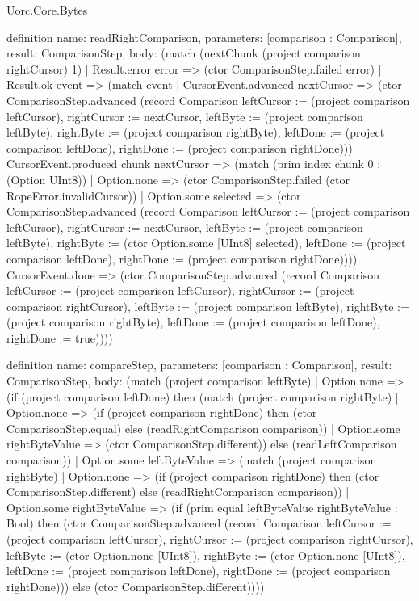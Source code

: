 \begin{lexlean}{Uorc.Core.Bytes}
\begin{semanticmodule}
definition{
  name: readRightComparison,
  parameters: [comparison : Comparison],
  result: ComparisonStep,
  body: (match (nextChunk (project comparison rightCursor) 1)
    | Result.error error => (ctor ComparisonStep.failed error)
    | Result.ok event => (match event
      | CursorEvent.advanced nextCursor => (ctor ComparisonStep.advanced (record Comparison {leftCursor := (project comparison leftCursor), rightCursor := nextCursor, leftByte := (project comparison leftByte), rightByte := (project comparison rightByte), leftDone := (project comparison leftDone), rightDone := (project comparison rightDone)}))
      | CursorEvent.produced chunk nextCursor => (match (prim index chunk 0 : (Option UInt8))
        | Option.none => (ctor ComparisonStep.failed (ctor RopeError.invalidCursor))
        | Option.some selected => (ctor ComparisonStep.advanced (record Comparison {leftCursor := (project comparison leftCursor), rightCursor := nextCursor, leftByte := (project comparison leftByte), rightByte := (ctor Option.some [UInt8] selected), leftDone := (project comparison leftDone), rightDone := (project comparison rightDone)})))
      | CursorEvent.done => (ctor ComparisonStep.advanced (record Comparison {leftCursor := (project comparison leftCursor), rightCursor := (project comparison rightCursor), leftByte := (project comparison leftByte), rightByte := (project comparison rightByte), leftDone := (project comparison leftDone), rightDone := true}))))
}

definition{
  name: compareStep,
  parameters: [comparison : Comparison],
  result: ComparisonStep,
  body: (match (project comparison leftByte)
    | Option.none => (if (project comparison leftDone) then (match (project comparison rightByte)
      | Option.none => (if (project comparison rightDone) then (ctor ComparisonStep.equal) else (readRightComparison comparison))
      | Option.some rightByteValue => (ctor ComparisonStep.different)) else (readLeftComparison comparison))
    | Option.some leftByteValue => (match (project comparison rightByte)
      | Option.none => (if (project comparison rightDone) then (ctor ComparisonStep.different) else (readRightComparison comparison))
      | Option.some rightByteValue => (if (prim equal leftByteValue rightByteValue : Bool) then (ctor ComparisonStep.advanced (record Comparison {leftCursor := (project comparison leftCursor), rightCursor := (project comparison rightCursor), leftByte := (ctor Option.none [UInt8]), rightByte := (ctor Option.none [UInt8]), leftDone := (project comparison leftDone), rightDone := (project comparison rightDone)})) else (ctor ComparisonStep.different))))
}


\end{semanticmodule}
\end{lexlean}
